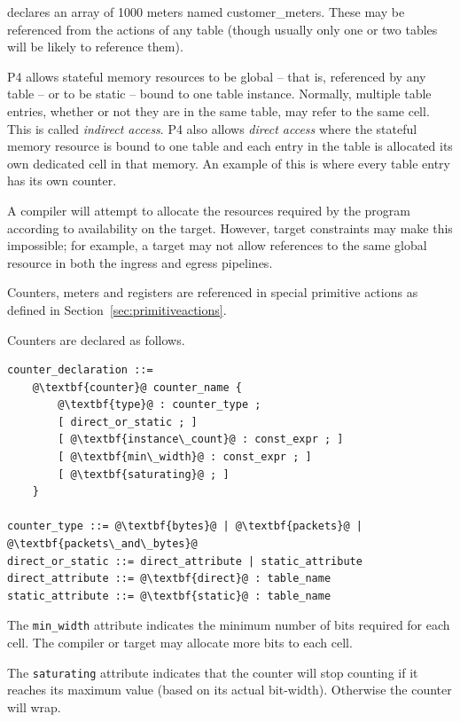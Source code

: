 \documentclass[12pt]{article}
\begin{document}
declares an array of 1000 meters named customer_meters. These may be referenced 
from the actions of any table (though usually only one or two tables will 
be likely to reference them).

P4 allows stateful memory resources to be global -- that is, referenced by 
any table -- or to be static -- bound to one table instance. Normally, multiple 
table entries, whether or not they are in the same table, may refer to the 
same cell. This is called \textit{indirect access}. P4 also allows \textit{direct access} where 
the stateful memory resource is bound to one table and each entry in the table 
is allocated its own dedicated cell in that memory. An example of this is 
where every table entry has its own counter.

A compiler will attempt to allocate the resources required by the program 
according to availability on the target. However, target constraints may make 
this impossible; for example, a target may not allow references to the same 
global resource in both the ingress and egress pipelines.

Counters, meters and registers are referenced in special primitive actions as defined 
in Section~\ref{sec:primitiveactions}.


Counters are declared as follows.

\begin{lstlisting}[frame=single,backgroundcolor=\color{bnfgreen},escapechar=\@]
counter_declaration ::=
    @\textbf{counter}@ counter_name { 
        @\textbf{type}@ : counter_type ;
        [ direct_or_static ; ]
        [ @\textbf{instance\_count}@ : const_expr ; ]
        [ @\textbf{min\_width}@ : const_expr ; ]
        [ @\textbf{saturating}@ ; ]
    }

counter_type ::= @\textbf{bytes}@ | @\textbf{packets}@ | @\textbf{packets\_and\_bytes}@
direct_or_static ::= direct_attribute | static_attribute
direct_attribute ::= @\textbf{direct}@ : table_name
static_attribute ::= @\textbf{static}@ : table_name
\end{lstlisting}


The \texttt{min_width} attribute indicates the minimum number of bits
required for each cell.  The compiler or target may allocate more bits
to each cell.

The \texttt{saturating} attribute indicates that the counter will stop
counting if it reaches its maximum value (based on its actual
bit-width). Otherwise the counter will wrap.
\end{document}
